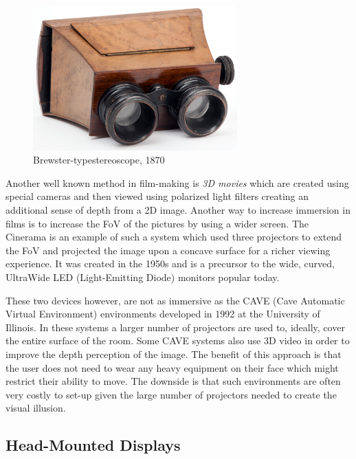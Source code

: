\begin{figure}[ht!]%
\centering
\includegraphics[width=0.7\textwidth]{img/stereoscope.jpg} 
\caption{Brewster-type\protect\footnotemark stereoscope, 1870 \cite{FileIGB032online}}
\end{figure}


Another well known method in film-making is \textit{3D movies} which are created using special cameras and then viewed using polarized light filters creating an additional sense of depth from a 2D image. Another way to increase immersion in films is to increase the FoV of the pictures by using a wider screen. The Cinerama is an example of such a system which used three projectors to extend the FoV and projected the image upon a concave surface for a richer viewing experience. It was created in the 1950s and is a precursor to the wide, curved, UltraWide LED (Light-Emitting Diode) monitors popular today. 

These two devices however, are not as immersive as the CAVE (Cave Automatic Virtual Environment) environments developed in 1992 at the University of Illinois. In these systems a larger number of projectors are used to, ideally, cover the entire surface of the room. Some CAVE systems also use 3D video in order to improve the depth perception of the image. The benefit of this approach is that the user does not need to wear any heavy equipment on their face which might restrict their ability to move. The downside is that such environments are often very costly to set-up given the large number of projectors needed to create the visual illusion. 

\subsection{Head-Mounted Displays}

